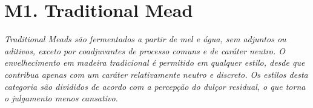 \section*{M1. Traditional Mead}

\textit{Traditional Meads são fermentados a partir de mel e água, sem adjuntos ou aditivos, exceto por coadjuvantes de processo comuns e de caráter neutro. O envelhecimento em madeira tradicional é permitido em qualquer estilo, desde que contribua apenas com um caráter relativamente neutro e discreto. Os estilos desta categoria são divididos de acordo com a percepção do dulçor residual, o que torna o julgamento menos cansativo.}